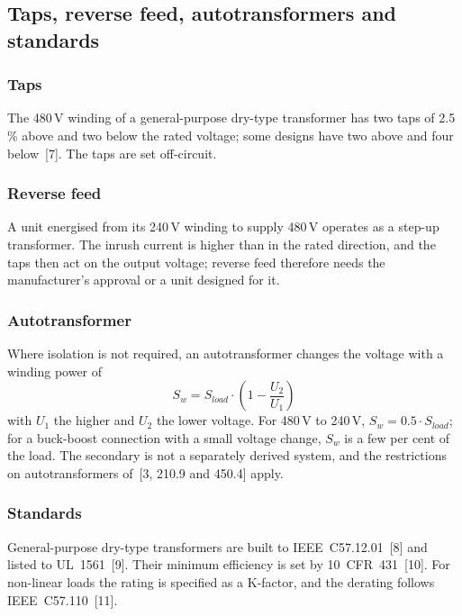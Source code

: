 \subsection{Taps, reverse feed, autotransformers and standards}
\label{sec:na-application}

\subsubsection{Taps}
The 480\,V winding of a general-purpose dry-type transformer has two taps
of 2.5\,\% above and two below the rated voltage; some designs have two
above and four below~[7]. The taps are set off-circuit.

\subsubsection{Reverse feed}
A unit energised from its 240\,V winding to supply 480\,V operates as a
step-up transformer. The inrush current is higher than in the rated
direction, and the taps then act on the output voltage; reverse feed
therefore needs the manufacturer's approval or a unit designed for it.

\subsubsection{Autotransformer}
Where isolation is not required, an autotransformer changes the voltage
with a winding power of
\begin{equation}
  S_{w} = S_{load} \cdot \left(1 - \frac{U_{2}}{U_{1}}\right)
  \label{eq:na-auto}
\end{equation}
with $U_{1}$ the higher and $U_{2}$ the lower voltage. For 480\,V to
240\,V, $S_{w} = 0.5 \cdot S_{load}$; for a buck-boost connection with a
small voltage change, $S_{w}$ is a few per cent of the load. The secondary is
not a separately derived system, and the restrictions on autotransformers
of~[3, 210.9 and 450.4] apply.

\subsubsection{Standards}
General-purpose dry-type transformers are built to IEEE~C57.12.01~[8]
and listed to UL~1561~[9]. Their minimum efficiency is set by
10~CFR~431~[10]. For non-linear loads the rating is specified as a
K-factor, and the derating follows IEEE~C57.110~[11].
\FloatBarrier
